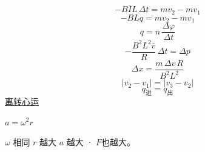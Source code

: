\[ -B\bar{I}L\,\Delta t=mv_2-mv_1 \]
\[ -BLq=mv_2-mv_1 \]
\[ q=n\,\frac{\Delta\varphi}{\Delta t} \]%
\[ -\frac{B^2L^2\bar{v}}{R}\,\Delta t=\Delta p \]
\[ \Delta x=\frac{m\,\Delta v\,R}{B^2L^2} \]
\[ |v_2-v_1|=|v_3-v_2| \]
\[ q_{\text{进}}=q_{\text{出}} \]
\underline{离转心运}%

$a=\omega^2 r$

$\omega$ 相同 $r$ 越大 $a$ 越大 · $F$也越大。%
